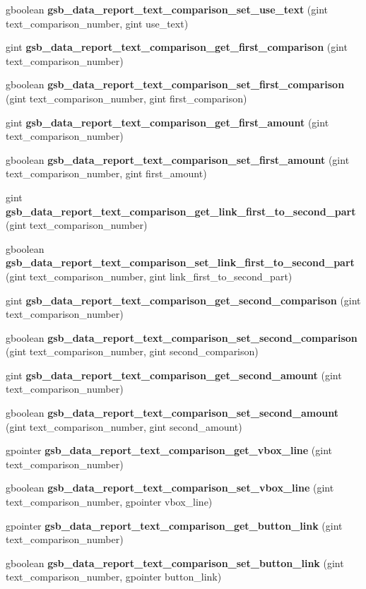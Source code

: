 \begin{DoxyCompactItemize}
gboolean {\bf gsb\_\-data\_\-report\_\-text\_\-comparison\_\-set\_\-use\_\-text} (gint text\_\-comparison\_\-number, gint use\_\-text)
\item 
gint {\bf gsb\_\-data\_\-report\_\-text\_\-comparison\_\-get\_\-first\_\-comparison} (gint text\_\-comparison\_\-number)
\item 
gboolean {\bf gsb\_\-data\_\-report\_\-text\_\-comparison\_\-set\_\-first\_\-comparison} (gint text\_\-comparison\_\-number, gint first\_\-comparison)
\item 
gint {\bf gsb\_\-data\_\-report\_\-text\_\-comparison\_\-get\_\-first\_\-amount} (gint text\_\-comparison\_\-number)
\item 
gboolean {\bf gsb\_\-data\_\-report\_\-text\_\-comparison\_\-set\_\-first\_\-amount} (gint text\_\-comparison\_\-number, gint first\_\-amount)
\item 
gint {\bf gsb\_\-data\_\-report\_\-text\_\-comparison\_\-get\_\-link\_\-first\_\-to\_\-second\_\-part} (gint text\_\-comparison\_\-number)
\item 
gboolean {\bf gsb\_\-data\_\-report\_\-text\_\-comparison\_\-set\_\-link\_\-first\_\-to\_\-second\_\-part} (gint text\_\-comparison\_\-number, gint link\_\-first\_\-to\_\-second\_\-part)
\item 
gint {\bf gsb\_\-data\_\-report\_\-text\_\-comparison\_\-get\_\-second\_\-comparison} (gint text\_\-comparison\_\-number)
\item 
gboolean {\bf gsb\_\-data\_\-report\_\-text\_\-comparison\_\-set\_\-second\_\-comparison} (gint text\_\-comparison\_\-number, gint second\_\-comparison)
\item 
gint {\bf gsb\_\-data\_\-report\_\-text\_\-comparison\_\-get\_\-second\_\-amount} (gint text\_\-comparison\_\-number)
\item 
gboolean {\bf gsb\_\-data\_\-report\_\-text\_\-comparison\_\-set\_\-second\_\-amount} (gint text\_\-comparison\_\-number, gint second\_\-amount)
\item 
gpointer {\bf gsb\_\-data\_\-report\_\-text\_\-comparison\_\-get\_\-vbox\_\-line} (gint text\_\-comparison\_\-number)
\item 
gboolean {\bf gsb\_\-data\_\-report\_\-text\_\-comparison\_\-set\_\-vbox\_\-line} (gint text\_\-comparison\_\-number, gpointer vbox\_\-line)
\item 
gpointer {\bf gsb\_\-data\_\-report\_\-text\_\-comparison\_\-get\_\-button\_\-link} (gint text\_\-comparison\_\-number)
\item 
gboolean {\bf gsb\_\-data\_\-report\_\-text\_\-comparison\_\-set\_\-button\_\-link} (gint text\_\-comparison\_\-number, gpointer button\_\-link)

\end{DoxyCompactItemize}
